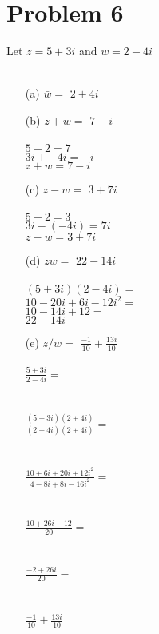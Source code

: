 \documentclass[12pt]{article}
\begin{document}
\section{Problem 6}
Let $z = 5 + 3i$ and $w = 2 - 4i$\\ \\

\begin{enumerate}
\item[(a)] $\bar{w} =$  {\Large$2 + 4i$ }\\
\item[(b)] $z + w = $  {\Large$7 - i$}\\  \\
$ 5 + 2 = 7$\\
$3i + -4i = -i $\\
$z + w = 7 - i$\\
\item[(c)]$z - w =$ {\Large$3 + 7i$}\\ \\
$5 - 2 = 3$\\
$3i - (-4i) = 7i$\\
$z - w = 3 + 7i$\\
\item[(d)] $zw = $ {\Large$22 - 14i$}\\ \\
$(5 + 3i)(2 - 4i) = $\\
$10 - 20i + 6i - 12i^2 = $\\
$10 - 14i + 12 = $\\
$22 - 14i$\\
\item[(e)] $z/w = $ {\Large$\frac{-1}{10} + \frac{13i}{10}$}\\ \\

{\Large $\frac{5 + 3i}{2 - 4i} = $\\ \\ \\
$\frac{(5 + 3i)(2 + 4i)}{(2 - 4i)(2 + 4i)} = $\\ \\ \\
$\frac{10 + 6i + 20i + 12i^2}{4 - 8i + 8i -16i^2} = $\\ \\ \\
$\frac{10 + 26i - 12}{20} = $\\ \\ \\
$\frac{-2 + 26i}{20} = $\\ \\ \\
$\frac{-1}{10} + \frac{13i}{10}$\\  \\ \\}
\end{enumerate}
\end{document}
